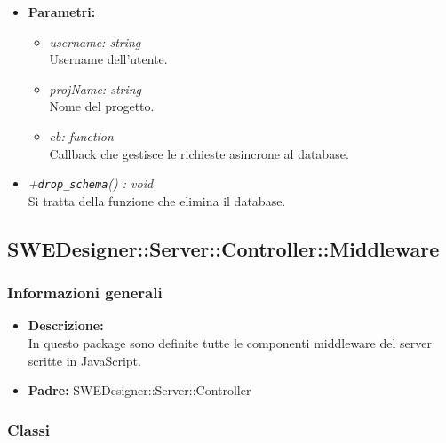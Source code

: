 \begin{itemize}
\begin{itemize}
            \item \textbf{Parametri: }
            \begin{itemize}
              \item \emph{username: string}\\
              Username dell'utente.
              \item \emph{projName: string}\\
              Nome del progetto.
              \item \emph{cb: function}\\
              Callback che gestisce le richieste asincrone al database.
            \end{itemize}
            \item \emph{+\texttt{drop\_schema}() : void}\\
            Si tratta della funzione che elimina il database.
          \end{itemize}
        \end{itemize}
  \subsection{SWEDesigner::Server::Controller::Middleware}
    \subsubsection{Informazioni generali}
      \begin{itemize}
        \item \textbf{Descrizione: }\\
        In questo package sono definite tutte le componenti middleware del server scritte in JavaScript.
        \item \textbf{Padre: }SWEDesigner::Server::Controller
      \end{itemize}
    \subsubsection{Classi}
